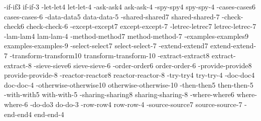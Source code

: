 {    {-if}{-if}3
    {if-}{if-}3
    {-let}{-let}4
    {let-}{let-}4
    {-ask}{-ask}4
    {ask-}{ask-}4
    {-spy}{-spy}4
    {spy-}{spy-}4
    {-cases}{-cases}6
    {cases-}{cases-}6
    {-data}{-data}5
    {data-}{data-}5
    {-shared}{-shared}7
    {shared-}{shared-}7
    {-check}{-check}6
    {check-}{check-}6
    {-except}{-except}7
    {except-}{except-}7
    {-letrec}{-letrec}7
    {letrec-}{letrec-}7
    {-lam}{-lam}4
    {lam-}{lam-}4
    {-method}{-method}7
    {method-}{method-}7
    {-examples}{-examples}9
    {examples-}{examples-}9
    {-select}{-select}7
    {select-}{select-}7
    {-extend}{-extend}7
    {extend-}{extend-}7
    {-transform}{-transform}{10}
    {transform-}{transform-}{10}
    {-extract}{-extract}8
    {extract-}{extract-}8
    {-sieve}{-sieve}6
    {sieve-}{sieve-}6
    {-order}{-order}6
    {order-}{order-}6
    {-provide}{-provide}8
    {provide-}{provide-}8
    {-reactor}{-reactor}8
    {reactor-}{reactor-}8
    {-try}{-try}4
    {try-}{try-}4
    {-doc}{-doc}4
    {doc-}{doc-}4
    {-otherwise}{-otherwise}{10}
    {otherwise-}{otherwise-}{10}
    {-then}{-then}5
    {then-}{then-}5
    {-with}{-with}5
    {with-}{with-}5
    {-sharing}{-sharing}8
    {sharing-}{sharing-}8
    {-where}{-where}6
    {where-}{where-}6
    {-do}{-do}3
    {do-}{do-}3
    {-row}{-row}4
    {row-}{row-}4
    {-source}{-source}7
    {source-}{source-}7
    {-end}{-end}4
    {end-}{end-}4
}
